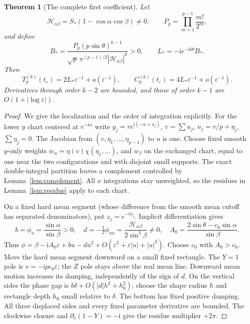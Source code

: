 \documentclass[11pt]{article}
\numberwithin{equation}{section}
\newtheorem{theorem}{Theorem}[section]
\theoremstyle{definition}
\newcommand{\ii}{\mathrm i}
\newcommand{\eps}{\varepsilon}
\newcommand{\Hpair}{\mathcal H_{\alpha\beta}}
\begin{document}
\begin{theorem}[The complete first coefficient]\label{thm:first}
Let
\[
 \Hpair=S_*(1-\cos\alpha\cos\beta)\ne0,
 \qquad P_p=\prod_{m=1}^{p-1}\frac{m!}{2^m},
\]
and define
\begin{equation}
 B_* =\frac{P_p(p\sin\theta)^{k-1}}
 {\sqrt p\,\pi^{(p-1)/2}|\Hpair|^k}>0,
 \qquad L_*=-\ii e^{-\ii k\theta}B_*.
 \label{eq:amplitudeclosed}
\end{equation}
Then
\[
 T_p^{(k)}(t_\eps)=2L_*\eps^{-1}+o(\eps^{-1}),\qquad
 C_p^{(k)}(t_\eps)=4L_*\eps^{-1}+o(\eps^{-1}).
\]
Derivatives through order $k-2$ are bounded, and those of order
$k-1$ are $O(1+|\log\eps|)$.
\end{theorem}
\begin{proof}
We give the localization and the order of integration explicitly.
For the lower $y$ chart centered at $e^{-\ii\alpha}$ write
$y_j=r e^{\ii(-\alpha+u_j)}$, $v=\sum u_j$,
$u_j=v/p+\eta_j$, $\sum\eta_j=0$. The Jacobian from
$(v,\eta_1,\ldots,\eta_{p-1})$ to $u$ is one. Choose fixed
smooth $y$-only weights $w_\alpha=\eta(v)\chi(\eta_1,\ldots)$,
and $w_\beta$ on the exchanged chart, equal to one near the two
configurations and with disjoint small supports. The exact
double-integral partition leaves a complement controlled by
Lemma~\ref{lem:complement}. All $x$ integrations stay unweighted,
so the residues in Lemma~\ref{lem:residue} apply to each chart.

On a fixed hard mean segment (whose difference from the smooth
mean cutoff has separated denominators), put $z_j=e^{-\ii\phi_j}$.
Implicit differentiation gives
\[
 b=\phi_u=\frac{\sin\alpha}{\sin\beta}>0,\quad
 d=-\tfrac12\phi_{uu}=\frac{\Hpair}{2\sin^3\beta}\ne0,
 \quad A_0=\frac{2\sin\theta-c_0\sin\alpha}{\sin\beta}.
\]
Thus
$\phi=\beta-\ii A_0\eps+bu-du^2+
O(\eps^2+\eps|u|+|u|^3)$. Choose $c_0$ with $A_0>c_0$.
Move the hard mean segment downward on a small fixed rectangle.
The $Y=1$ pole is $v=-\ii pc_0\eps$; the $Z$ pole stays above
the real mean line. Downward mean motion increases its damping,
independently of the sign of $d$. On the vertical sides the phase
gap is $b\delta+O(|d|h^2+h_0^2)$; choose the shape radius $h$
and rectangle depth $h_0$ small relative to $\delta$. The bottom
has fixed positive damping. All three displaced sides and every
fixed parameter derivative are bounded. The clockwise closure and
$\partial_v(1-Y)=-\ii$ give the residue multiplier $+2\pi$.


\end{proof}
\end{document}

